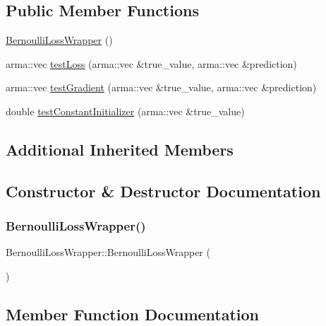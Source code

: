\subsection*{Public Member Functions}
\begin{DoxyCompactItemize}
\item 
\mbox{\hyperlink{class_bernoulli_loss_wrapper_afe2d6bb990fbcec1a0961de4fcb551cb}{Bernoulli\+Loss\+Wrapper}} ()
\item 
arma\+::vec \mbox{\hyperlink{class_bernoulli_loss_wrapper_a9d3294f43955415ea0a3d80b941a8b2a}{test\+Loss}} (arma\+::vec \&true\+\_\+value, arma\+::vec \&prediction)
\item 
arma\+::vec \mbox{\hyperlink{class_bernoulli_loss_wrapper_a1b38529b66b4ec5ea6028d715719c20f}{test\+Gradient}} (arma\+::vec \&true\+\_\+value, arma\+::vec \&prediction)
\item 
double \mbox{\hyperlink{class_bernoulli_loss_wrapper_adb7db2cbd85452a787ddf0c82e0e5f37}{test\+Constant\+Initializer}} (arma\+::vec \&true\+\_\+value)
\end{DoxyCompactItemize}
\subsection*{Additional Inherited Members}


\subsection{Constructor \& Destructor Documentation}
\mbox{\label{class_bernoulli_loss_wrapper_afe2d6bb990fbcec1a0961de4fcb551cb}} 
\subsubsection{\texorpdfstring{Bernoulli\+Loss\+Wrapper()}{BernoulliLossWrapper()}}
{\footnotesize\ttfamily Bernoulli\+Loss\+Wrapper\+::\+Bernoulli\+Loss\+Wrapper (\begin{DoxyParamCaption}{ }\end{DoxyParamCaption})\hspace{0.3cm}{\ttfamily [inline]}}



\subsection{Member Function Documentation}
\mbox{\label{class_bernoulli_loss_wrapper_adb7db2cbd85452a787ddf0c82e0e5f37}} 
